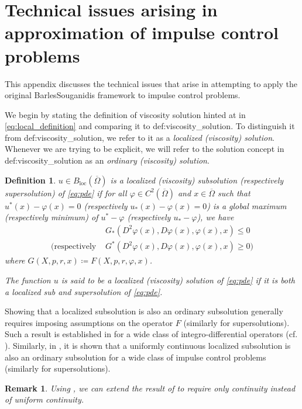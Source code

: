 \documentclass[12pt]{article}
\newcounter{dummy}
\newtheorem{definition}[dummy]{Definition}
\newtheorem{rem}[dummy]{Remark}
\begin{document}
\section{\label{app:technical}Technical issues arising in approximation of
impulse control problems}

This appendix discusses the technical issues that arise in attempting
to apply the original Barles\textendash Souganidis framework to impulse
control problems.

We begin by stating the definition of viscosity solution hinted at
in \eqref{eq:local_definition} and comparing it to {\prettyref}{def:viscosity_solution}.
To distinguish it from {\prettyref}{def:viscosity_solution}, we refer
to it as a \emph{localized (viscosity) solution}. Whenever we are
trying to be explicit, we will refer to the solution concept in {\prettyref}{def:viscosity_solution}
as an \emph{ordinary (viscosity) solution}.
\begin{definition}
\label{def:localized_viscosity_solution}$u\in B_{\operatorname{loc}}(\overline{\Omega})$
is a localized (viscosity) subsolution (respectively supersolution)
of \eqref{eq:pde} if for all $\varphi\in C^{2}(\overline{\Omega})$
and $x\in\overline{\Omega}$ such that $u^{*}(x)-\varphi(x)=0$ (respectively
$u_{*}(x)-\varphi(x)=0$) is a global maximum (respectively minimum)
of $u^{*}-\varphi$ (respectively $u_{*}-\varphi$), we have
\begin{align*}
 & G_{*}(D^{2}\varphi(x),D\varphi(x),\varphi(x),x){\leqslant}0\\
\text{(respectively } & G^{*}(D^{2}\varphi(x),D\varphi(x),\varphi(x),x){\geqslant}0\text{)}
\end{align*}
where $G(X,p,r,x)\coloneqq F(X,p,r,\varphi,x)$.

The function $u$ is said to be a localized (viscosity) solution of
\eqref{eq:pde} if it is both a localized sub and supersolution of
\eqref{eq:pde}.
\end{definition}
Showing that a localized subsolution is also an ordinary subsolution
generally requires imposing assumptions on the operator $F$ (similarly
for supersolutions). Such a result is established in \cite[Pg. 300]{MR1395674}
for a wide class of integro-differential operators (cf. \cite[Section 1]{MR2422079}).
Similarly, in \cite[Theorem 3.1]{MR2486085}, it is shown that a uniformly
continuous localized subsolution is also an ordinary subsolution for
a wide class of impulse control problems (similarly for supersolutions).

\begin{rem}\label{rem:fathi}Using \cite[Exercise 6(ii)]{MR3002594},
we can extend the result of \cite[Theorem 3.1]{MR2486085} to require
only continuity instead of uniform continuity.\end{rem}
\end{document}
